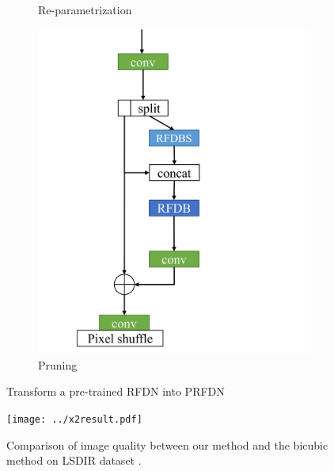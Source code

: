 \documentclass[10pt,twocolumn,letterpaper]{article}
\begin{document}
\begin{figure}
\begin{subfigure}[b]{0.49\linewidth}
        \caption{Re-parametrization}
        \label{fig:Re-parametrization}
    \end{subfigure}
    \begin{subfigure}[b]{0.49\linewidth}
		\centering
        \includegraphics[width=\textwidth]{../Pruning.pdf}
        \caption{Pruning}
        \label{fig:Pruning}
    \end{subfigure}
    \caption{Transform a pre-trained RFDN into PRFDN}
    \label{fig:PRFDN}
\end{figure}


\begin{figure}[t]
    \begin{center}
    \texttt{[image: ../x2result.pdf]}
    \end{center}
    \caption{Comparison of image quality between our method and the bicubic method on LSDIR dataset
    .}
    \label{yolov3}
\end{figure}
\end{document}
